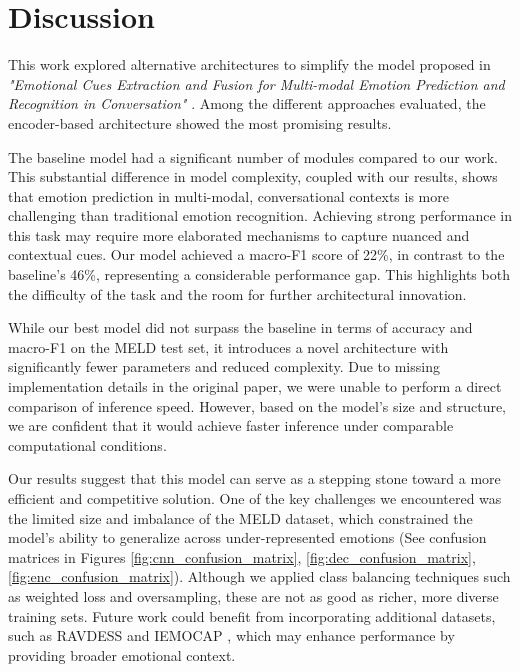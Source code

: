 \documentclass{article}
\begin{document}
\section{Discussion}

This work explored alternative architectures to simplify the model proposed in \textit{"Emotional Cues Extraction and Fusion for Multi-modal Emotion Prediction and Recognition in Conversation"} \cite{ERCFusionModel}. Among the different approaches evaluated, the encoder-based architecture showed the most promising results.

The baseline model had a significant number of modules compared to our work. This substantial difference in model complexity, coupled with our results, shows that emotion prediction in multi-modal, conversational contexts is more challenging than traditional emotion recognition. Achieving strong performance in this task may require more elaborated mechanisms to capture nuanced and contextual cues. Our model achieved a macro-F1 score of 22\%, in contrast to the baseline's 46\%, representing a considerable performance gap. This highlights both the difficulty of the task and the room for further architectural innovation.

While our best model did not surpass the baseline in terms of accuracy and macro-F1 on the MELD test set, it introduces a novel architecture with significantly fewer parameters and reduced complexity. Due to missing implementation details in the original paper, we were unable to perform a direct comparison of inference speed. However, based on the model’s size and structure, we are confident that it would achieve faster inference under comparable computational conditions.

Our results suggest that this model can serve as a stepping stone toward a more efficient and competitive solution. One of the key challenges we encountered was the limited size and imbalance of the MELD dataset, which constrained the model's ability to generalize across under-represented emotions (See confusion matrices in Figures \ref{fig:cnn_confusion_matrix}, \ref{fig:dec_confusion_matrix}, \ref{fig:enc_confusion_matrix}).  Although we applied class balancing techniques such as weighted loss and oversampling, these are not as good as richer, more diverse training sets. Future work could benefit from incorporating additional datasets, such as RAVDESS \cite{livingstone2018ravdess} and IEMOCAP \cite{busso2008iemocap}, which may enhance performance by providing broader emotional context.
\end{document}
